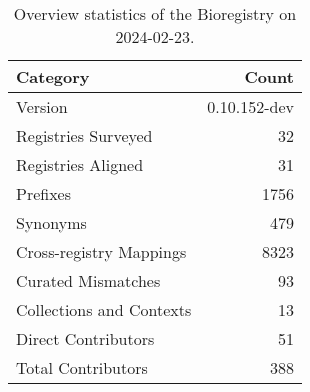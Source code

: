 \begin{table}
\caption{Overview statistics of the Bioregistry on 2024-02-23.}
\label{tab:bioregistry-summary}
\begin{tabular}{lr}
\toprule
Category & Count \\
\midrule
Version & 0.10.152-dev \\
Registries Surveyed & 32 \\
Registries Aligned & 31 \\
Prefixes & 1756 \\
Synonyms & 479 \\
Cross-registry Mappings & 8323 \\
Curated Mismatches & 93 \\
Collections and Contexts & 13 \\
Direct Contributors & 51 \\
Total Contributors & 388 \\
\bottomrule
\end{tabular}
\end{table}
